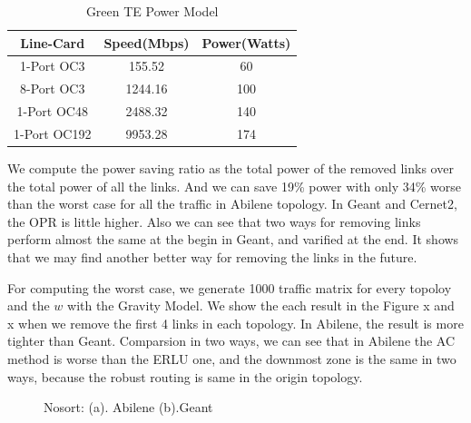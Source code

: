 \documentclass[conference]{IEEEtran}
\begin{document}
\begin{table}[!t]
\renewcommand{\arraystretch}{1}
\caption{Green TE Power Model}
\label{power model}
\centering
\begin{tabular}{|c|c|c|}
\hline
\bfseries Line-Card & \bfseries Speed(Mbps) & \bfseries Power(Watts) \\
\hline
1-Port OC3 & 155.52 & 60 \\
\hline
8-Port OC3 & 1244.16 & 100 \\
\hline
1-Port OC48 & 2488.32 & 140 \\
\hline
1-Port OC192 & 9953.28 & 174 \\
\hline
\end{tabular}
\end{table}

We compute the power saving ratio as the total power of the removed links over the total power of all the links. And we can
save 19\% power with only 34\% worse than the worst case for all the traffic in Abilene topology. In Geant and Cernet2, 
the OPR is little higher. Also we can see that two ways for removing links perform almost the same at the begin in Geant,
and varified at the end. It shows that we may find another better way for removing the links in the future.


For computing the worst case, we generate 1000 traffic matrix for every topoloy and the $w$ with the Gravity Model.
We show the each result in the Figure x and x when we remove the first 4 links in each topology. In Abilene, the result 
is more tighter than Geant. Comparsion in two ways, we can see that in Abilene the AC method is worse than the ERLU one,
and the downmost zone is the same in two ways, because the robust routing is same in the origin topology.

\begin{figure}[!t]
\centering
\vspace*{0.1in}
\caption{Nosort: (a). Abilene (b).Geant}
\vspace*{0.1in}
\end{figure}
\end{document}
